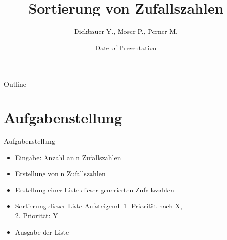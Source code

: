 \documentclass{beamer}
\title[BSP03 - Sortierung ZZ]{Sortierung von Zufallszahlen}
\author{Dickbauer Y., Moser P., Perner M.}
\institute{PS Computergestützte Modellierung, WS 2016/17}
\date{Date of Presentation}
\begin{document}
\begin{frame}
  \titlepage
\end{frame}

\begin{frame}{Outline}
  \tableofcontents
\end{frame}

\section{Aufgabenstellung}
\begin{frame}{Aufgabenstellung}

\begin{itemize}
  \item Eingabe: Anzahl an n Zufallszahlen
  \item Erstellung von n Zufallszahlen
  \item Erstellung einer Liste dieser generierten Zufallszahlen
  \item Sortierung dieser Liste Aufsteigend. 1. Priorität nach X, \\2. Priorität: Y
  \item Ausgabe der Liste
\end{itemize}

\end{frame}
\end{document}
